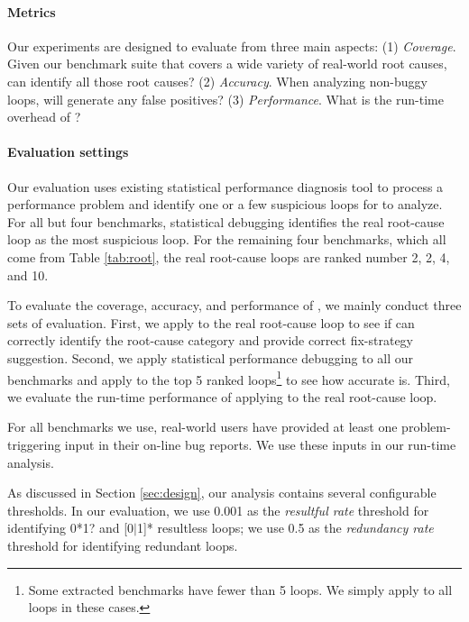 \paragraph{Metrics}
Our experiments are designed to evaluate \Tool from three main aspects:
(1) 
\textit{Coverage}. Given our benchmark suite that covers a wide variety
of real-world root causes, can \Tool identify all those root causes?
(2)
\textit{Accuracy}. 
When analyzing non-buggy loops, will \Tool generate any false positives?
(3) 
\textit{Performance}.
What is the run-time overhead of \Tool?

\paragraph{Evaluation settings}
Our evaluation uses existing statistical performance diagnosis
tool \cite{SongOOPSLA2014} to process a performance problem and identify 
one or a few suspicious loops for \Tool to analyze.
For all but four benchmarks, statistical debugging identifies the
real root-cause loop as the most suspicious loop. For the remaining four
benchmarks, which all come from Table \ref{tab:root},
the real root-cause loops are ranked number 2, 2, 4, and 10.

%

To evaluate the coverage, accuracy, and performance of \Tool, we mainly conduct
three sets of evaluation. First, we apply \Tool to the real root-cause loop to
see if \Tool can correctly identify the root-cause category and provide
correct fix-strategy suggestion. Second, we apply
statistical performance debugging \cite{SongOOPSLA2014} to all our benchmarks
and apply \Tool to the top 5 ranked loops\footnote{Some extracted benchmarks
have fewer than 5 loops. We simply apply \Tool to all loops in these cases.}
to see how accurate \Tool is. Third, we evaluate the run-time performance of
applying \Tool to the real root-cause loop. 
 
For all benchmarks we use, real-world
users have provided at least one problem-triggering input in their on-line 
bug reports. We use these inputs in our run-time analysis.

As discussed in Section \ref{sec:design}, our analysis contains 
several configurable thresholds. In our evaluation,
we use 0.001 as the \textit{resultful rate} threshold for identifying
0*1? 
and [0$|$1]* resultless loops; we use 
0.5 as the \textit{redundancy rate} threshold for identifying redundant loops.

